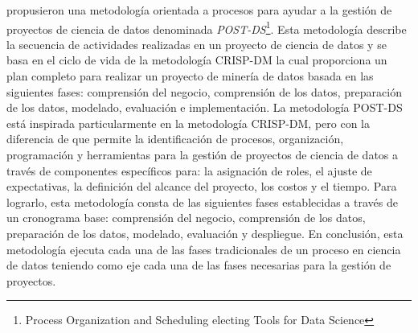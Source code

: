 \cite{Costa2020} propusieron una metodología orientada a procesos para ayudar a la gestión de proyectos de ciencia de datos denominada \textit{POST-DS}\footnote{Process Organization and Scheduling electing Tools for Data Science}. Esta metodología describe la secuencia de actividades realizadas en un proyecto de ciencia de datos y se basa en el ciclo de vida de la metodología CRISP-DM la cual proporciona un plan completo para realizar un proyecto de minería de datos basada en las siguientes fases: comprensión del negocio, comprensión de los datos, preparación de los datos, modelado, evaluación e implementación. La metodología POST-DS está inspirada particularmente en la metodología CRISP-DM, pero con la diferencia de que permite la identificación de procesos, organización, programación y herramientas para la gestión de proyectos de ciencia de datos a través de componentes específicos para: la asignación de roles, el ajuste de expectativas, la definición del alcance del proyecto, los costos y el tiempo. Para lograrlo, esta metodología consta de las siguientes fases establecidas a través de un cronograma base: comprensión del negocio, comprensión de los datos, preparación de los datos, modelado, evaluación y despliegue. En conclusión, esta metodología ejecuta cada una de las fases tradicionales de un proceso en ciencia de datos teniendo como eje cada una de las fases necesarias para la gestión de proyectos.

